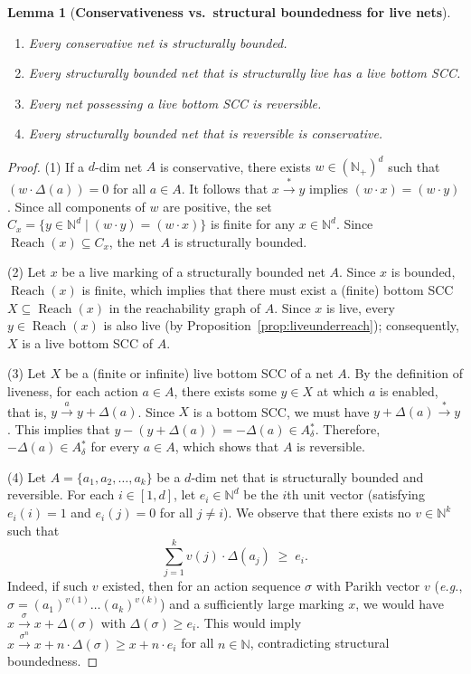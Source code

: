 \documentclass[11pt,a4paper]{amsart}
\DeclareMathOperator{\Reach}{Reach}
\newcommand{\step}[1]{\mathrel{\xrightarrow{#1}}}
\newcommand{\reach}{\step{*}}
\newcommand{\D}{{}_{\delta}}
\newcommand{\Nat}{\mathbb{N}}
\newcommand{\setN}{\Nat}
\newcommand{\scalar}[2]{(#1 \cdot #2)}
\def\eg{{\em e.g.}}
\theoremstyle{plain}
\newtheorem{lem}[thm]{Lemma}
\theoremstyle{definition}
\theoremstyle{defC}
\theoremstyle{thmC}
\begin{document}
\begin{lem}[\textbf{Conservativeness vs.~structural boundedness for
	live nets}]\label{lem:consstrbound}\hfill
	\begin{enumerate}
\item
Every conservative net is structurally bounded.
\item
Every structurally bounded net that is structurally live has a live
			bottom SCC.	
		\item
Every net possessing a live bottom SCC is reversible.			
		\item
Every structurally bounded net that is reversible is conservative.
\end{enumerate}
\end{lem}
\begin{proof}
	(1)
	If a $d$-dim net $A$ is conservative, there exists $w\in(\setN_+)^d$
	such that $\scalar{w}{\Delta(a)}=0$ for all $a\in A$. It
	follows that 
	$x\reach y$ implies $\scalar{w}{x}=\scalar{w}{y}$. Since  
 all components of $w$ are positive, the set $C_x=\{y\in\setN^d\mid
	\scalar{w}{y}=\scalar{w}{x}\}$ is finite for any $x\in\setN^d$. Since
	$\Reach(x)\subseteq C_x$, the net $A$ is structurally bounded.

(2)
Let $x$ be a live marking of a structurally bounded net $A$.
	Since $x$ is bounded, $\Reach(x)$ is finite, which implies
	that there must
	exist a (finite) bottom SCC $X\subseteq\Reach(x)$ in the
	reachability graph of $A$.
	Since $x$ is live, every $y\in\Reach(x)$ is also live (by
	Proposition~\ref{prop:liveunderreach});
	consequently, $X$ is a live bottom SCC of $A$.

	(3) Let $X$ be a (finite or infinite) live bottom SCC of a net
	$A$.  By the definition of 
liveness,
	for
 each action $a\in A$, there exists some $y\in X$ at which $a$ is enabled,
that is, 
 $y\step{a}y+\Delta(a)$. Since $X$ is a bottom SCC, we must have
	$y+\Delta(a)\reach y$.
	This implies that $y-(y+\Delta(a))=-\Delta(a)\in A\D^*$. 
	Therefore, $-\Delta(a)\in A\D^*$ for every $a\in A$, which
	shows that $A$ is
	reversible.

	(4)
	Let $A=\{a_1,a_2,\ldots,a_k\}$ be a $d$-dim net 
that is structurally bounded and reversible.
	For each $i\in[1,d]$, let $e_i\in\setN^d$
	be the $i$th unit vector (satisfying
	$e_i(i)=1$ and $e_i(j)=0$ for all $j\neq i$). We observe that
	there exists no
	$v\in \setN^k$ such that
	\begin{equation}\label{eq:biggerei}
		\sum_{j=1}^{k} v(j)\cdot\Delta(a_j) \;\geq\; e_i.
	\end{equation}
Indeed, if such $v$ existed, then for an action sequence 
$\sigma$ with Parikh vector $v$  
	(\eg, $\sigma=(a_1)^{v(1)}\ldots (a_k)^{v(k)}$)
	and a sufficiently large marking $x$, we would have
	 $x\step{\sigma}x+\Delta(\sigma)$ with $\Delta(\sigma)\geq
	 e_i$.
This would imply $x\step{\sigma^n}x+n\cdot\Delta(\sigma)\geq x+n\cdot
	e_i$ for all $n\in\setN$, contradicting structural
	boundedness.


\end{proof}
\end{document}
